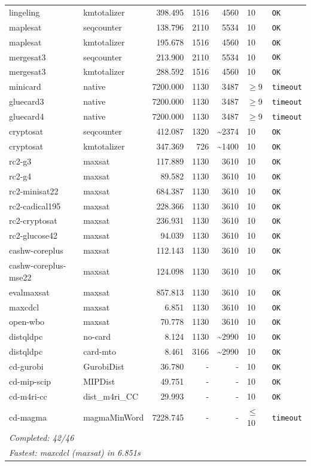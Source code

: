 \begin{longtable}{llrrrl p{}}
lingeling & kmtotalizer & 398.495 & 1516 & 4560 & 10 & \texttt{OK} \\
maplesat & seqcounter & 138.796 & 2110 & 5534 & 10 & \texttt{OK} \\
maplesat & kmtotalizer & 195.678 & 1516 & 4560 & 10 & \texttt{OK} \\
mergesat3 & seqcounter & 213.900 & 2110 & 5534 & 10 & \texttt{OK} \\
mergesat3 & kmtotalizer & 288.592 & 1516 & 4560 & 10 & \texttt{OK} \\
minicard & native & 7200.000 & 1130 & 3487 & $\geq$9 & \texttt{timeout} \\
gluecard3 & native & 7200.000 & 1130 & 3487 & $\geq$9 & \texttt{timeout} \\
gluecard4 & native & 7200.000 & 1130 & 3487 & $\geq$9 & \texttt{timeout} \\
cryptosat & seqcounter & 412.087 & 1320 & \textasciitilde{}2374 & 10 & \texttt{OK} \\
cryptosat & kmtotalizer & 347.369 & 726 & \textasciitilde{}1400 & 10 & \texttt{OK} \\
rc2-g3 & maxsat & 117.889 & 1130 & 3610 & 10 & \texttt{OK} \\
rc2-g4 & maxsat & 89.582 & 1130 & 3610 & 10 & \texttt{OK} \\
rc2-minisat22 & maxsat & 684.387 & 1130 & 3610 & 10 & \texttt{OK} \\
rc2-cadical195 & maxsat & 228.366 & 1130 & 3610 & 10 & \texttt{OK} \\
rc2-cryptosat & maxsat & 236.931 & 1130 & 3610 & 10 & \texttt{OK} \\
rc2-glucose42 & maxsat & 94.039 & 1130 & 3610 & 10 & \texttt{OK} \\
cashw-coreplus & maxsat & 112.143 & 1130 & 3610 & 10 & \texttt{OK} \\
cashw-coreplus-mse22 & maxsat & 124.098 & 1130 & 3610 & 10 & \texttt{OK} \\
evalmaxsat & maxsat & 857.813 & 1130 & 3610 & 10 & \texttt{OK} \\
maxcdcl & maxsat & 6.851 & 1130 & 3610 & 10 & \texttt{OK} \\
open-wbo & maxsat & 70.778 & 1130 & 3610 & 10 & \texttt{OK} \\
distqldpc & no-card & 8.124 & 1130 & \textasciitilde{}2990 & 10 & \texttt{OK} \\
distqldpc & card-mto & 8.461 & 3166 & \textasciitilde{}2990 & 10 & \texttt{OK} \\
cd-gurobi & GurobiDist & 36.780 & - & - & 10 & \texttt{OK} \\
cd-mip-scip & MIPDist & 49.751 & - & - & 10 & \texttt{OK} \\
cd-m4ri-cc & dist\_m4ri\_CC & 29.993 & - & - & 10 & \texttt{OK} \\
cd-magma & magmaMinWord & 7228.745 & - & - & $\leq$10 & \texttt{timeout} \\
\midrule
\multicolumn{7}{l}{\textit{Completed: 42/46}} \\
\multicolumn{7}{l}{\textit{Fastest: maxcdcl (maxsat) in 6.851s}} \\
\end{longtable}
